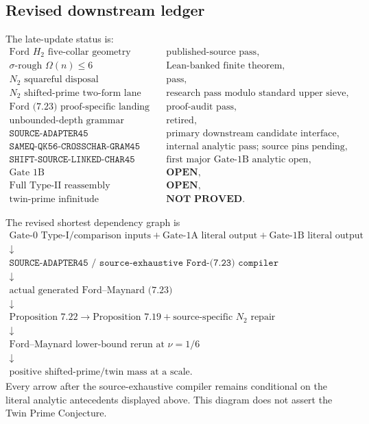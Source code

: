 \documentclass[11pt]{article}
\theoremstyle{definition}
\newcommand{\1}{\mathbf 1}
\begin{document}
\subsection{Revised downstream ledger}
The late-update status is:
\[
\begin{array}{ll}
 \text{Ford }H_2\text{ five-collar geometry}
   & \text{published-source pass},\\
 \sigma\text{-rough }\Omega(n)\le6
   & \text{Lean-banked finite theorem},\\
 N_2\text{ squareful disposal}
   & \text{pass},\\
 N_2\text{ shifted-prime two-form lane}
   & \text{research pass modulo standard upper sieve},\\
 \text{Ford (7.23) proof-specific landing}
   & \text{proof-audit pass},\\
 \text{unbounded-depth grammar concern}
   & \text{retired},\\
 \texttt{SOURCE-ADAPTER45}
   & \text{primary downstream candidate interface},\\
 \texttt{SAMEQ-QK56-CROSSCHAR-GRAM45}
   & \text{internal analytic pass; source pins pending},\\
 \texttt{SHIFT-SOURCE-LINKED-CHAR45}
   & \text{first major Gate-1B analytic open},\\
 \text{Gate 1B}
   & \textbf{OPEN},\\
 \text{Full Type-II reassembly}
   & \textbf{OPEN},\\
 \text{twin-prime infinitude}
   & \textbf{NOT PROVED}.
\end{array}
\]

The revised shortest dependency graph is
\[
\begin{gathered}
 \text{Gate-0 Type-I/comparison inputs}
 +\text{Gate-1A literal output}
 +\text{Gate-1B literal output}\\
 \downarrow\\
 \boxed{\texttt{SOURCE-ADAPTER45 / source-exhaustive Ford-(7.23) compiler}}\\
 \downarrow\\
 \text{actual generated Ford--Maynard (7.23)}\\
 \downarrow\\
 \text{Proposition 7.22}\to\text{Proposition 7.19}
 +\text{source-specific }N_2\text{ repair}\\
 \downarrow\\
 \text{Ford--Maynard lower-bound rerun at }\nu=1/6\\
 \downarrow\\
 \text{positive shifted-prime/twin mass at a scale}.
\end{gathered}
\]
Every arrow after the source-exhaustive compiler remains conditional on the
literal analytic antecedents displayed above.  This diagram does not assert
the Twin Prime Conjecture.
\end{document}
